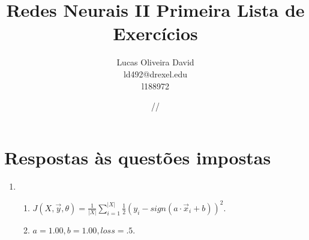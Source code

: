 \documentclass[12pt]{report}
\title{\textbf{Redes Neurais II Primeira Lista de Exercícios}}
\author{Lucas Oliveira David\\ld492@drexel.edu\\l188972}
\date{\oldstylenums{28}/\oldstylenums{09}/\oldstylenums{2016}}
\begin{document}
\maketitle

\section{Respostas às questões impostas}

\begin{enumerate}
	\item ~\begin{enumerate}
		\item $J(X, \vec y, \theta) = \frac{1}{|X|} \sum_{i = 1}^{|X|}
		        \frac{1}{2}(y_i - sign(a \cdot \vec x_i + b))^2$.

		\item $a= 1.00, b= 1.00, loss = .5$.
		

\end{enumerate}
\end{enumerate}
\end{document}

